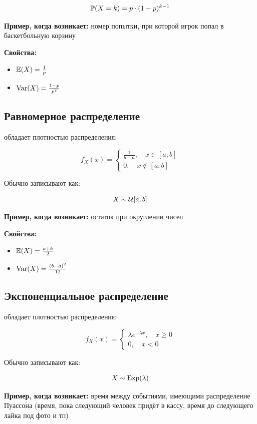 \documentclass[12pt, a4paper, oneside]{article}
\begin{document}
$$
\mathbb{P}(X = k) = p \cdot (1 - p)^{k - 1}
$$

\textbf{Пример, когда возникает:} номер попытки, при которой игрок попал в баскетбольную корзину

\textbf{Свойства:}

\begin{itemize} 
\item $\mathbb{E}(X) = \frac{1}{p}$
\item $\operatorname{Var}(X) = \frac{1-p}{p^2}$
\end{itemize} 


\subsection*{Равномерное распределение}

 обладает плотностью распределения: 

$$
f_X(x) =\begin{cases}
\frac{1}{b - a}, \quad x \in [a; b]  \\
0, \quad x \notin [a; b]
\end{cases}
$$

Обычно записывают как:

$$
X \sim \mathcal{U}[a; b]
$$

\textbf{Пример, когда возникает:} остаток при округлении чисел

\textbf{Свойства:}

\begin{itemize} 
\item $\mathbb{E}(X) = \frac{a + b}{2}$
\item $\operatorname{Var}(X) = \frac{(b - a)^2}{12}$
\end{itemize} 


\subsection*{Экспоненциальное распределение}

 обладает плотностью распределения: 

$$
f_X(x) =\begin{cases}
\lambda e^{- \lambda x}, \quad x \ge 0  \\
0, \quad x < 0
\end{cases}
$$

Обычно записывают как:

$$
X \sim \operatorname{Exp}(\lambda)
$$

\textbf{Пример, когда возникает:} время между событиями, имеющими распределение Пуассона (время, пока следующий человек придёт в кассу, время до следующего лайка под фото и тп)
\end{document}
